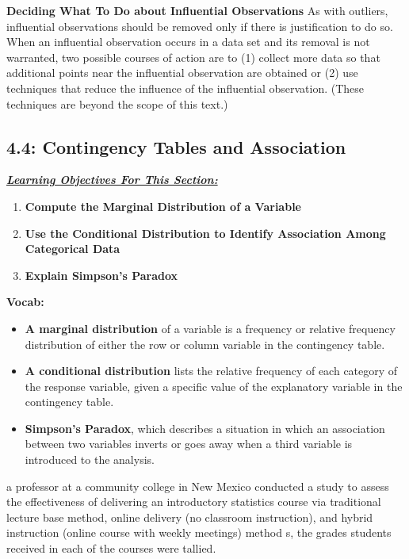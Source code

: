 \documentclass{report}
\begin{document}
    \bigbreak \noindent 
    \textbf{Deciding What To Do about Influential Observations}
    \bigbreak \noindent 
    As with outliers, influential observations should be removed only if there is justification to do so. When an influential observation occurs in a data set and its removal is not warranted, two possible courses of action are to (1) collect more data so that additional points near the influential observation are obtained or (2) use techniques that reduce the influence of the influential observation. (These techniques are beyond the scope of this text.)
    \bigbreak \noindent 

    \pagebreak \bigbreak \noindent
    \subsection{4.4: Contingency Tables and Association}
    \bigbreak \noindent 
    \textbf{\textit{\underline{Learning Objectives For This Section:}}}
    \begin{enumerate}
        \item \textbf{Compute the Marginal Distribution of a Variable}
        \item \textbf{Use the Conditional Distribution to Identify Association Among Categorical Data}
        \item \textbf{Explain Simpson's Paradox}
    \end{enumerate}
    \textbf{Vocab:}
    \begin{itemize}
        \item \textbf{A marginal distribution} of a variable is a frequency or relative frequency distribution of either the row or column variable in the contingency table.
        \item \textbf{A conditional distribution} lists the relative frequency of each category of the response variable, given a specific value of the explanatory variable in the contingency table.
        \item \textbf{Simpson's Paradox}, which describes a situation in which an association between two variables inverts or goes away when a third variable is introduced to the analysis.
    \end{itemize}
    \bigbreak \noindent 
    a professor at a community college in New Mexico conducted a study to assess the effectiveness of delivering an introductory statistics course via traditional lecture base method, online delivery (no classroom instruction), and hybrid instruction (online course with weekly meetings) method s, the grades students received in each of the courses were tallied.
\end{document}
